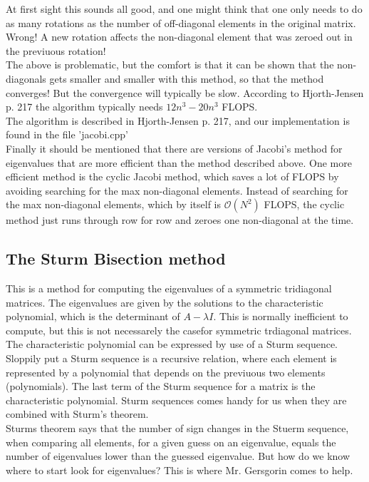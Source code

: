 \documentclass{article}
\begin{document}
At first sight this sounds all good, and one might think that one only needs to do as many rotations as the number of off-diagonal elements in the original matrix. Wrong! A new rotation affects the non-diagonal element that was zeroed out in the previuous rotation!\\

The above is problematic, but the comfort is that it can be shown that the non-diagonals gets smaller and smaller with this method, so that the method converges! But the convergence will typically be slow. According to Hjorth-Jensen \cite{MHJ} p. 217 the algorithm typically needs $12n^3-20n^3$ FLOPS.\\

The algorithm is described in Hjorth-Jensen \cite{MHJ} p. 217, and our implementation is found in the file 'jacobi.cpp'\\

Finally it should be mentioned that there are versions of Jacobi's method for eigenvalues that are more efficient than the method described above. One more efficient method is the cyclic Jacobi method, which saves a lot of FLOPS by avoiding searching for the max non-diagonal elements. Instead of searching for the max non-diagonal elements, which by itself is $\mathcal{O}(N^2)$ FLOPS, the cyclic method just runs through row for row and zeroes one non-diagonal at the time.

\subsection{The Sturm Bisection method}
This is a method for computing the eigenvalues of a symmetric tridiagonal matrices. The eigenvalues are given by the solutions to the characteristic polynomial, which is the determinant of $A - \lambda I$. This is normally inefficient to compute, but this is not necessarely the casefor symmetric trdiagonal matrices. \\

The characteristic polynomial can be expressed by use of a Sturm sequence. Sloppily put a Sturm sequence is a recursive relation, where each element is represented by a polynomial that depends on the previuous two elements (polynomials). The last term of the Sturm sequence for a matrix is the characteristic polynomial. Sturm sequences comes handy for us when they are combined with Sturm's theorem.\\

Sturms theorem says that the number of sign changes in the Stuerm sequence, when comparing all elements, for a given guess on an eigenvalue, equals the number of eigenvalues lower than the guessed eigenvalue. But how do we know where to start look for eigenvalues? This is where Mr. Gersgorin comes to help.\\
\end{document}
